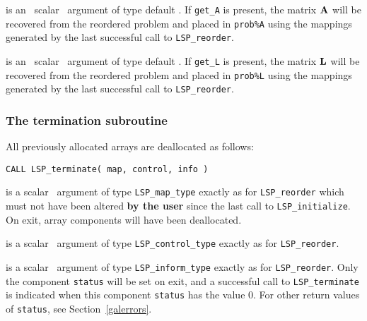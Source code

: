 \documentclass{galahad}
\newcommand{\packagename}{LSP}
\begin{document}
\begin{description}
is an \optional\ scalar \intentin\ argument of type default \logical. 
If {\tt get\_A} is present, the matrix ${\mathbf{A}}$
will be recovered from the reordered problem and placed in {\tt prob\%A} 
using the mappings generated by the last successful call to 
{\tt \packagename\_reorder}. 
 
is an \optional\ scalar \intentin\ argument of type default \logical. 
If {\tt get\_L} is present, the matrix ${\mathbf{L}}$
will be recovered from the reordered problem and placed in {\tt prob\%L} 
using the mappings generated by the last successful call to 
{\tt \packagename\_reorder}. 

\end{description}


\subsubsection{The  termination subroutine}
All previously allocated arrays are deallocated as follows:
\vspace*{1mm}

\hspace{8mm}
{\tt CALL \packagename\_terminate( map, control, info )}

\vspace*{-3mm}
\begin{description}

 is a scalar \intentinout\ argument of type 
{\tt \packagename\_map\_type} 
exactly as for 
{\tt \packagename\_reorder}
which must not have been altered {\bf by the user} since the last call to 
{\tt \packagename\_initialize}.
On exit, array components will have been deallocated.

 is a scalar \intentin\ argument of type 
{\tt \packagename\_control\_type}
exactly as for
{\tt \packagename\_reorder}.

 is a scalar \intentout\ argument of type 
{\tt \packagename\_inform\_type}
exactly as for
{\tt \packagename\_reorder}.
Only the component {\tt status} will be set on exit, and a 
successful call to 
{\tt \packagename\_terminate}
is indicated when this  component {\tt status} has the value 0. 
For other return values of {\tt status}, see Section~\ref{galerrors}.

\end{description}

\end{document}
